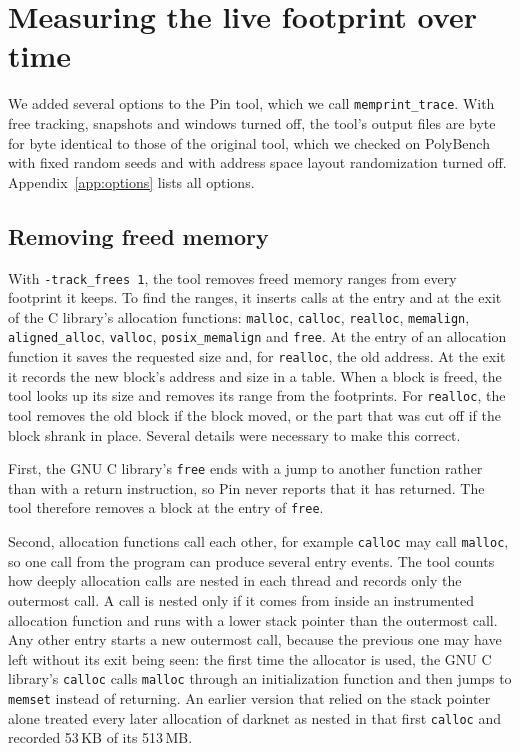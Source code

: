 \documentclass[11pt]{article}
\newcommand{\knob}[1]{\texttt{-#1}}
\begin{document}
\section{Measuring the live footprint over time}
\label{sec:tool}

We added several options to the Pin tool, which we call \texttt{memprint\_trace}. With free tracking, snapshots and windows turned off, the tool's output files are byte for byte identical to those of the original tool, which we checked on PolyBench with fixed random seeds and with address space layout randomization turned off. Appendix~\ref{app:options} lists all options.

\subsection{Removing freed memory}
\label{sec:frees}

With \knob{track\_frees 1}, the tool removes freed memory ranges from every footprint it keeps. To find the ranges, it inserts calls at the entry and at the exit of the C library's allocation functions: \texttt{malloc}, \texttt{calloc}, \texttt{realloc}, \texttt{memalign}, \texttt{aligned\_alloc}, \texttt{valloc}, \texttt{posix\_memalign} and \texttt{free}. At the entry of an allocation function it saves the requested size and, for \texttt{realloc}, the old address. At the exit it records the new block's address and size in a table. When a block is freed, the tool looks up its size and removes its range from the footprints. For \texttt{realloc}, the tool removes the old block if the block moved, or the part that was cut off if the block shrank in place. Several details were necessary to make this correct.

First, the GNU C library's \texttt{free} ends with a jump to another function rather than with a return instruction, so Pin never reports that it has returned. The tool therefore removes a block at the entry of \texttt{free}.

Second, allocation functions call each other, for example \texttt{calloc} may call \texttt{malloc}, so one call from the program can produce several entry events. The tool counts how deeply allocation calls are nested in each thread and records only the outermost call. A call is nested only if it comes from inside an instrumented allocation function and runs with a lower stack pointer than the outermost call. Any other entry starts a new outermost call, because the previous one may have left without its exit being seen: the first time the allocator is used, the GNU C library's \texttt{calloc} calls \texttt{malloc} through an initialization function and then jumps to \texttt{memset} instead of returning. An earlier version that relied on the stack pointer alone treated every later allocation of darknet as nested in that first \texttt{calloc} and recorded 53\,KB of its 513\,MB.
\end{document}
